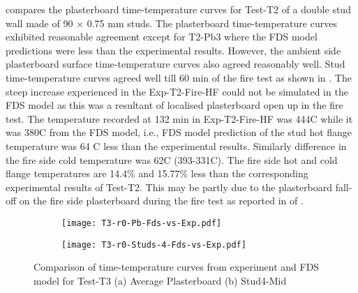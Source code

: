  compares the plasterboard time-temperature curves for Test-T2 of a double stud wall made of 90 $\times$ 0.75 mm studs. The plasterboard time-temperature curves exhibited reasonable agreement except for T2-Pb3 where the FDS model predictions were less than the experimental results. However, the ambient side plasterboard surface time-temperature curves also agreed reasonably well. Stud time-temperature curves agreed well till 60 min of the fire test as shown in . The steep increase experienced in the Exp-T2-Fire-HF could not be simulated in the FDS model as this was a resultant of localised plasterboard open up in the fire test. The temperature recorded at 132 min in Exp-T2-Fire-HF was 444\degree C while it was 380\degree C from the FDS model, i.e., FDS model prediction of the stud hot flange temperature was 64 \degree C less than the experimental results. Similarly difference in the fire side cold temperature was 62\degree C (393-331\degree C). The fire side hot and cold flange temperatures are 14.4\% and 15.77\% less than the corresponding experimental results of Test-T2. This may be partly due to the plasterboard fall-off on the fire side plasterboard during the fire test as reported in  of .
\begin{figure}[!htbp]
	\centering
	\begin{subfigure}[b]{0.7\textwidth}
		\centering
		\texttt{[image: T3-r0-Pb-Fds-vs-Exp.pdf]}
		\caption{}
		\label{subfig:T3-r0-Pb-Fds-vs-Exp}
	\end{subfigure}
	\begin{subfigure}[b]{0.6\textwidth}
		\centering
		\texttt{[image: T3-r0-Studs-4-Fds-vs-Exp.pdf]}
		\caption{}
		\label{subfig:T3-r0-Studs-4-Fds-vs-Exp}
	\end{subfigure}
	   \caption{Comparison of time-temperature curves from experiment and FDS model for Test-T3 (a) Average Plasterboard (b) Stud4-Mid}
	   \label{fig:fds-output-pb-studs-t3}
\end{figure}

